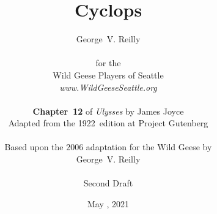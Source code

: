 


\title{\Huge Cyclops}
\author{George~V. Reilly\\
\\
{\small for the}\\
Wild Geese Players of Seattle\\
{\textit{www.WildGeeseSeattle.org}}\\
\\
{\small \textbf{Chapter~12} of \textit{Ulysses} by James Joyce}\\
{\small Adapted from the 1922~edition at Project Gutenberg}
\\
\\
{\small Based upon the 2006 adaptation for the Wild Geese by}\\
{\small George~V. Reilly}\\
\\
{\small Second Draft}}
\date{May , 2021}
\raggedbottom



\maketitle
\thispagestyle{empty}

\newpage
\thispagestyle{empty}


